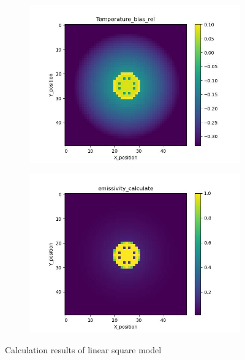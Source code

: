 \begin{figure}[htbp]
\begin{minipage}{\textwidth}
\begin{subfigure}{0.49\textwidth}
        \end{subfigure}
    \end{minipage}\\
    \begin{minipage}{\textwidth}
        \centering
        \begin{subfigure}{0.49\textwidth}
            \centering
            \includegraphics[width=\textwidth]{figures/raw_data/5/lin_square/T_bias.jpg}
        \end{subfigure}
        \begin{subfigure}{0.49\textwidth}
            \centering
            \includegraphics[width=\textwidth]{figures/raw_data/5/lin_square/emi_cal.jpg}
        \end{subfigure}
    \end{minipage}
    \caption{Calculation results of linear square model}
    \label{fig: result_linear_square_model}
\end{figure}

